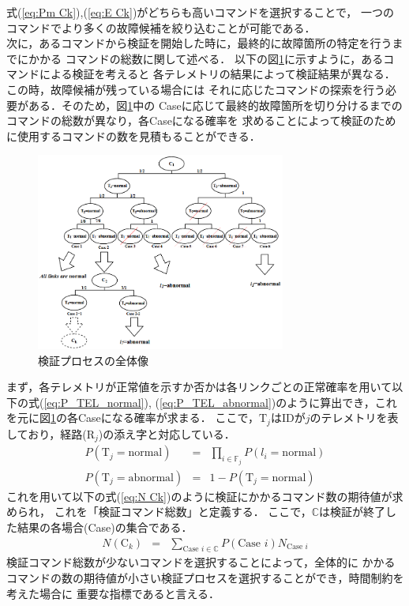 \documentclass[11pt]{jsarticle}%
\begin{document}
\begin{multicols}{2}
式(\ref{eq:Pm Ck}),(\ref{eq:E Ck})がどちらも高いコマンドを選択することで，
一つのコマンドでより多くの故障候補を絞り込むことが可能である．\\
  次に，あるコマンドから検証を開始した時に，最終的に故障箇所の特定を行うまでにかかる
  コマンドの総数に関して述べる．%
以下の図\ref{fig:all_process}に示すように，あるコマンドによる検証を考えると
各テレメトリの結果によって検証結果が異なる．この時，故障候補が残っている場合には
それに応じたコマンドの探索を行う必要がある．そのため，図\ref{fig:all_process}中の
Caseに応じて最終的故障箇所を切り分けるまでのコマンドの総数が異なり，各Caseになる確率を
求めることによって検証のために使用するコマンドの数を見積もることができる．
\begin{figure}[H]
  \centering
    \includegraphics[height=6.5cm]{../figure/all_process.png}
    \caption{検証プロセスの全体像}
    \label{fig:all_process}
\end{figure}
まず，各テレメトリが正常値を示すか否かは各リンクごとの正常確率を用いて以下の式(\ref{eq:P_TEL_normal}),
(\ref{eq:P_TEL_abnormal})のように算出でき，これを元に図\ref{fig:all_process}の各Caseになる確率が求まる．
ここで，$\text{T}_j$はIDが$j$のテレメトリを表しており，経路(R$_j$)の添え字と対応している．
\begin{eqnarray}
  P(\text{T}_j = \text{normal}) &=& \prod_{i\in\mathbb{F}_j} P(l_i = \text{normal}) \label{eq:P_TEL_normal}\\
  P(\text{T}_j = \text{abnormal}) &=& 1 - P(\text{T}_j = \text{normal}) \label{eq:P_TEL_abnormal}
\end{eqnarray}
これを用いて以下の式(\ref{eq:N Ck})のように検証にかかるコマンド数の期待値が求められ，
これを「検証コマンド総数」と定義する．
ここで，$\mathbb{C}$は検証が終了した結果の各場合(Case)の集合である．%
\begin{eqnarray}
  N(\text{C}_k) &=& \sum_{\text{Case }i\in\mathbb{C}} P(\text{Case }i) N_{\text{Case }i} \label{eq:N Ck}
\end{eqnarray}
検証コマンド総数が少ないコマンドを選択することによって，全体的に
かかるコマンドの数の期待値が小さい検証プロセスを選択することができ，時間制約を考えた場合に
重要な指標であると言える．


\end{multicols}
\end{document}
